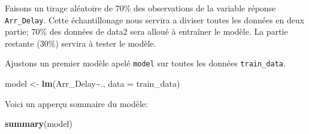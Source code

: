 \documentclass[
]{article}
\newenvironment{Shaded}{\begin{snugshade}}{\end{snugshade}}
\newcommand{\AttributeTok}[1]{\textcolor[rgb]{0.13,0.29,0.53}{#1}}
\newcommand{\DecValTok}[1]{\textcolor[rgb]{0.00,0.00,0.81}{#1}}
\newcommand{\FunctionTok}[1]{\textcolor[rgb]{0.13,0.29,0.53}{\textbf{#1}}}
\newcommand{\NormalTok}[1]{#1}
\newcommand{\OtherTok}[1]{\textcolor[rgb]{0.56,0.35,0.01}{#1}}
\newcommand{\SpecialCharTok}[1]{\textcolor[rgb]{0.81,0.36,0.00}{\textbf{#1}}}
\begin{document}
Faisons un tirage aléatoire de 70\% des observations de la variable
réponse \texttt{Arr\_Delay}. Cette échantillonage nous servira a diviser
toutes les données en deux partie; 70\% des données de data2 sera alloué
à entraîner le modèle. La partie restante (30\%) servira à tester le
modèle.

\begin{Shaded}
\end{Shaded}

Ajustons un premier modèle apelé \texttt{model} sur toutes les données
\texttt{train\_data}.

\begin{Shaded}
\begin{Highlighting}[]
\NormalTok{model }\OtherTok{\textless{}{-}} \FunctionTok{lm}\NormalTok{(Arr\_Delay}\SpecialCharTok{\textasciitilde{}}\NormalTok{., }\AttributeTok{data =}\NormalTok{ train\_data)}
\end{Highlighting}
\end{Shaded}

Voici un apperçu sommaire du modèle:

\begin{Shaded}
\begin{Highlighting}[]
\FunctionTok{summary}\NormalTok{(model)}
\end{Highlighting}
\end{Shaded}
\end{document}
